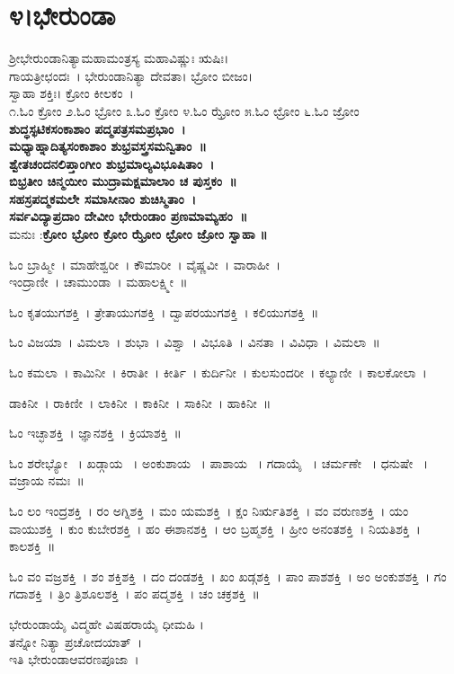 \section{೪।ಭೇರುಂಡಾ}
ಶ್ರೀಭೇರುಂಡಾನಿತ್ಯಾಮಹಾಮಂತ್ರಸ್ಯ ಮಹಾವಿಷ್ಣುಃ ಋಷಿಃ। \\ಗಾಯತ್ರೀಛಂದಃ~। ಭೇರುಂಡಾನಿತ್ಯಾ ದೇವತಾ। ಭ್ರೋಂ ಬೀಜಂ।\\ ಸ್ವಾಹಾ ಶಕ್ತಿಃ। ಕ್ರೋಂ ಕೀಲಕಂ~।\\
೧.ಓಂ ಕ್ರೋಂ ೨.ಓಂ ಭ್ರೋಂ ೩.ಓಂ ಕ್ರೋಂ ೪.ಓಂ ಝ್ರೋಂ ೫.ಓಂ ಛ್ರೋಂ ೬.ಓಂ ಜ್ರೋಂ \\
{\bfseries ಶುದ್ಧಸ್ಫಟಿಕಸಂಕಾಶಾಂ ಪದ್ಮಪತ್ರಸಮಪ್ರಭಾಂ~।\\
ಮಧ್ಯಾಹ್ನಾದಿತ್ಯಸಂಕಾಶಾಂ ಶುಭ್ರವಸ್ತ್ರಸಮನ್ವಿತಾಂ~॥\\
ಶ್ವೇತಚಂದನಲಿಪ್ತಾಂಗೀಂ ಶುಭ್ರಮಾಲ್ಯವಿಭೂಷಿತಾಂ~।\\	
ಬಿಭ್ರತೀಂ ಚಿನ್ಮಯೀಂ ಮುದ್ರಾಮಕ್ಷಮಾಲಾಂ ಚ ಪುಸ್ತಕಂ~॥\\
ಸಹಸ್ರಪದ್ಮಕಮಲೇ ಸಮಾಸೀನಾಂ ಶುಚಿಸ್ಮಿತಾಂ~।\\
ಸರ್ವವಿದ್ಯಾಪ್ರದಾಂ ದೇವೀಂ ಭೇರುಂಡಾಂ ಪ್ರಣಮಾಮ್ಯಹಂ~॥\\}
ಮನುಃ :{\bfseries ಕ್ರೋಂ ಭ್ರೋಂ ಕ್ರೋಂ ಝ್ರೋಂ ಛ್ರೋಂ ಜ್ರೋಂ ಸ್ವಾಹಾ ॥}

ಓಂ ಬ್ರಾಹ್ಮೀ~। ಮಾಹೇಶ್ವರೀ~। ಕೌಮಾರೀ~। ವೈಷ್ಣವೀ~। ವಾರಾಹೀ~।\\ ಇಂದ್ರಾಣೀ~। ಚಾಮುಂಡಾ~। ಮಹಾಲಕ್ಷ್ಮೀ~॥ 

ಓಂ ಕೃತಯುಗಶಕ್ತಿ~। ತ್ರೇತಾಯುಗಶಕ್ತಿ~। ದ್ವಾಪರಯುಗಶಕ್ತಿ~। ಕಲಿಯುಗಶಕ್ತಿ~॥ 

ಓಂ ವಿಜಯಾ~। ವಿಮಲಾ~। ಶುಭಾ~। ವಿಶ್ವಾ~। ವಿಭೂತಿ~। ವಿನತಾ~। ವಿವಿಧಾ~। ವಿಮಲಾ~॥ 

ಓಂ ಕಮಲಾ~। ಕಾಮಿನೀ~। ಕಿರಾತೀ~। ಕೀರ್ತಿ~। ಕುರ್ದಿನೀ~। ಕುಲಸುಂದರೀ~। ಕಲ್ಯಾಣೀ~। ಕಾಲಕೋಲಾ~। 

ಡಾಕಿನೀ~। ರಾಕಿಣೀ~। ಲಾಕಿನೀ~। ಕಾಕಿನೀ~। ಸಾಕಿನೀ~। ಹಾಕಿನೀ~॥ 

ಓಂ ಇಚ್ಛಾಶಕ್ತಿ~। ಜ್ಞಾನಶಕ್ತಿ~। ಕ್ರಿಯಾಶಕ್ತಿ~॥ 

ಓಂ ಶರೇಭ್ಯೋ ~। ಖಡ್ಗಾಯ ~। ಅಂಕುಶಾಯ ~। ಪಾಶಾಯ ~। ಗದಾಯೈ ~। ಚರ್ಮಣೇ ~। ಧನುಷೇ ~। ವಜ್ರಾಯ ನಮಃ~॥

ಓಂ ಲಂ ಇಂದ್ರಶಕ್ತಿ~। ರಂ ಅಗ್ನಿಶಕ್ತಿ~। ಮಂ ಯಮಶಕ್ತಿ~। ಕ್ಷಂ ನಿರ್ಋತಿಶಕ್ತಿ~। ವಂ ವರುಣಶಕ್ತಿ~। ಯಂ ವಾಯುಶಕ್ತಿ~। ಕುಂ ಕುಬೇರಶಕ್ತಿ~। ಹಂ ಈಶಾನಶಕ್ತಿ~। ಆಂ ಬ್ರಹ್ಮಶಕ್ತಿ~। ಹ್ರೀಂ ಅನಂತಶಕ್ತಿ~। ನಿಯತಿಶಕ್ತಿ~। ಕಾಲಶಕ್ತಿ~॥ 

ಓಂ ವಂ ವಜ್ರಶಕ್ತಿ~। ಶಂ ಶಕ್ತಿಶಕ್ತಿ~। ದಂ ದಂಡಶಕ್ತಿ~। ಖಂ ಖಡ್ಗಶಕ್ತಿ~। ಪಾಂ ಪಾಶಶಕ್ತಿ~। ಅಂ ಅಂಕುಶಶಕ್ತಿ~। ಗಂ ಗದಾಶಕ್ತಿ~। ತ್ರಿಂ ತ್ರಿಶೂಲಶಕ್ತಿ~। ಪಂ ಪದ್ಮಶಕ್ತಿ~। ಚಂ ಚಕ್ರಶಕ್ತಿ~॥ 

ಭೇರುಂಡಾಯೈ ವಿದ್ಮಹೇ ವಿಷಹರಾಯೈ ಧೀಮಹಿ ।\\ತನ್ನೋ ನಿತ್ಯಾ ಪ್ರಚೋದಯಾತ್~।\\
ಇತಿ ಭೇರುಂಡಾಆವರಣಪೂಜಾ~।
